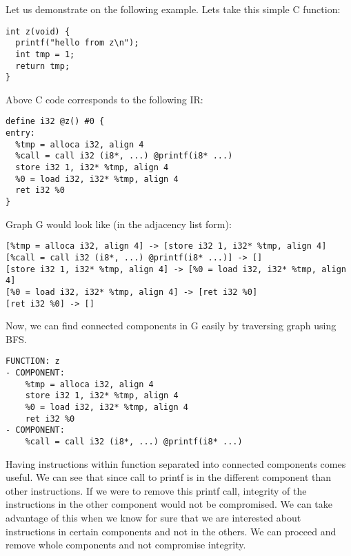 \documentclass[12pt, twoside]{fithesis2}
\renewcommand{\_}{\leavevmode \kern0.07em\vbox{\hrule width0.4em}}
\begin{document}
Let us demonstrate on the following example. Lets take this simple C function:

\begin{verbatim}
int z(void) {
  printf("hello from z\n");
  int tmp = 1;
  return tmp;
}
\end{verbatim}

Above C code corresponds to the following IR:

\begin{verbatim}
define i32 @z() #0 {
entry:
  %tmp = alloca i32, align 4
  %call = call i32 (i8*, ...) @printf(i8* ...)
  store i32 1, i32* %tmp, align 4
  %0 = load i32, i32* %tmp, align 4
  ret i32 %0
}
\end{verbatim}

Graph G would look like (in the adjacency list form):

\begin{verbatim}
[%tmp = alloca i32, align 4] -> [store i32 1, i32* %tmp, align 4]
[%call = call i32 (i8*, ...) @printf(i8* ...)] -> []
[store i32 1, i32* %tmp, align 4] -> [%0 = load i32, i32* %tmp, align 4]
[%0 = load i32, i32* %tmp, align 4] -> [ret i32 %0]
[ret i32 %0] -> []
\end{verbatim}

Now, we can find connected components in G easily by traversing graph using BFS.

\begin{verbatim}
FUNCTION: z
- COMPONENT:
    %tmp = alloca i32, align 4
    store i32 1, i32* %tmp, align 4
    %0 = load i32, i32* %tmp, align 4
    ret i32 %0
- COMPONENT:
    %call = call i32 (i8*, ...) @printf(i8* ...)
\end{verbatim}

Having instructions within function separated into connected components comes
useful. We can see that since call to printf is in the different component than
other instructions. If we were to remove this printf call, integrity of the
instructions in the other component would not be compromised. We can take
advantage of this when we know for sure that we are interested about
instructions in certain components and not in the others. We can proceed and
remove whole components and not compromise integrity.
\end{document}
